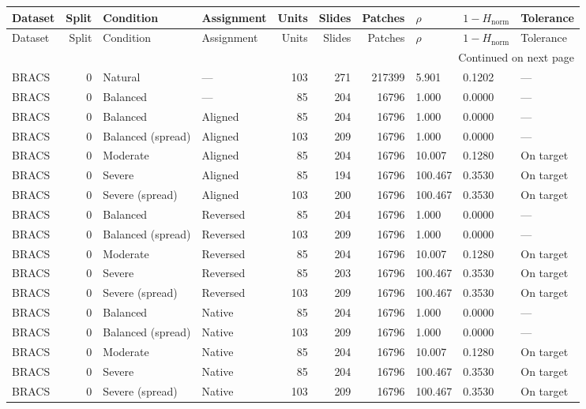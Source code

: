 \begin{longtable}{lrllrrrlll}
\toprule
Dataset & Split & Condition & Assignment & Units & Slides & Patches & $\rho$ & $1-H_{\mathrm{norm}}$ & Tolerance \\
\midrule
\endfirsthead
\toprule
Dataset & Split & Condition & Assignment & Units & Slides & Patches & $\rho$ & $1-H_{\mathrm{norm}}$ & Tolerance \\
\midrule
\endhead
\midrule
\multicolumn{10}{r}{Continued on next page} \\
\midrule
\endfoot
\bottomrule
\endlastfoot
BRACS & 0 & Natural & --- & 103 & 271 & 217399 & 5.901 & 0.1202 & --- \\
BRACS & 0 & Balanced & --- & 85 & 204 & 16796 & 1.000 & 0.0000 & --- \\
BRACS & 0 & Balanced & Aligned & 85 & 204 & 16796 & 1.000 & 0.0000 & --- \\
BRACS & 0 & Balanced (spread) & Aligned & 103 & 209 & 16796 & 1.000 & 0.0000 & --- \\
BRACS & 0 & Moderate & Aligned & 85 & 204 & 16796 & 10.007 & 0.1280 & On target \\
BRACS & 0 & Severe & Aligned & 85 & 194 & 16796 & 100.467 & 0.3530 & On target \\
BRACS & 0 & Severe (spread) & Aligned & 103 & 200 & 16796 & 100.467 & 0.3530 & On target \\
BRACS & 0 & Balanced & Reversed & 85 & 204 & 16796 & 1.000 & 0.0000 & --- \\
BRACS & 0 & Balanced (spread) & Reversed & 103 & 209 & 16796 & 1.000 & 0.0000 & --- \\
BRACS & 0 & Moderate & Reversed & 85 & 204 & 16796 & 10.007 & 0.1280 & On target \\
BRACS & 0 & Severe & Reversed & 85 & 203 & 16796 & 100.467 & 0.3530 & On target \\
BRACS & 0 & Severe (spread) & Reversed & 103 & 209 & 16796 & 100.467 & 0.3530 & On target \\
BRACS & 0 & Balanced & Native & 85 & 204 & 16796 & 1.000 & 0.0000 & --- \\
BRACS & 0 & Balanced (spread) & Native & 103 & 209 & 16796 & 1.000 & 0.0000 & --- \\
BRACS & 0 & Moderate & Native & 85 & 204 & 16796 & 10.007 & 0.1280 & On target \\
BRACS & 0 & Severe & Native & 85 & 204 & 16796 & 100.467 & 0.3530 & On target \\
BRACS & 0 & Severe (spread) & Native & 103 & 209 & 16796 & 100.467 & 0.3530 & On target \\

\end{longtable}
